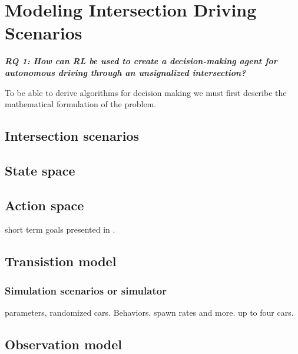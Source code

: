 \chapter{Modeling Intersection Driving Scenarios}
\label{ch:modeling_intersection}

\begin{center}
  \textit{\textbf{RQ 1: How can RL be used to create a decision-making agent for autonomous driving through an unsignalized intersection?}}
  \end{center}
  \vspace{12pt}
  
To be able to derive algorithms for decision making we must first describe the mathematical formulation of the problem.  

\section{Intersection scenarios}

\section{State space}

\section{Action space}
short term goals presented in \paperLSTM.

\section{Transistion model}

\subsection{Simulation scenarios or simulator}
parameters, randomized cars. Behaviors. spawn rates and more. up to four cars. 

\section{Observation model}

